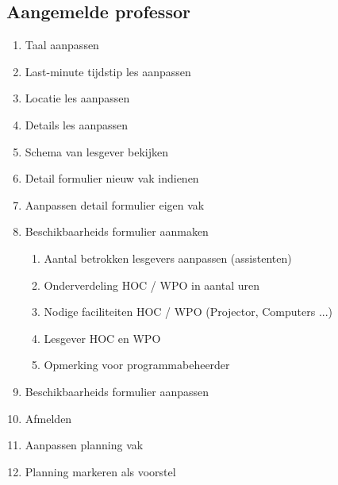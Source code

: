 \subsection{Aangemelde professor}
\begin{enumerate}
    \item Taal aanpassen
    \item Last-minute tijdstip les aanpassen 
    \item Locatie les aanpassen
    \item Details les aanpassen
    \item Schema van lesgever bekijken
    \item Detail formulier nieuw vak indienen
    \item Aanpassen detail formulier eigen vak
    \item Beschikbaarheids formulier aanmaken
    \begin{enumerate}
        \item Aantal betrokken lesgevers aanpassen (assistenten)
        \item Onderverdeling HOC / WPO in aantal uren
        \item Nodige faciliteiten HOC / WPO (Projector, Computers ...)
        \item Lesgever HOC en WPO
        \item Opmerking voor programmabeheerder
    \end{enumerate}
    \item Beschikbaarheids formulier aanpassen
    \item Afmelden
    \item Aanpassen planning vak
    \item Planning markeren als voorstel
\end{enumerate}

